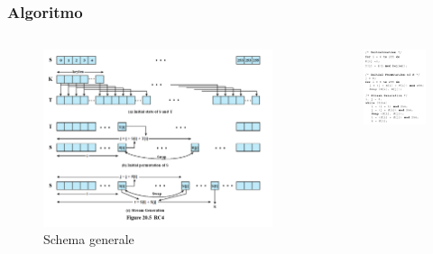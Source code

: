 		\begin{frame}
			\frametitle{Algoritmo}	
			\begin{columns}
				\begin{column}{0.65\textwidth}
					\begin{center}
						\begin{figure}
							\includegraphics[width=\columnwidth]{img/rc4}
							\caption{Schema generale}
						\end{figure}
					\end{center}
				\end{column}
				\begin{column}{0.35\textwidth}
					\begin{center}
						\begin{figure}
							\includegraphics[width=\columnwidth]{img/rc4algo}

\end{figure}
\end{center}
\end{column}
\end{columns}
\end{frame}
